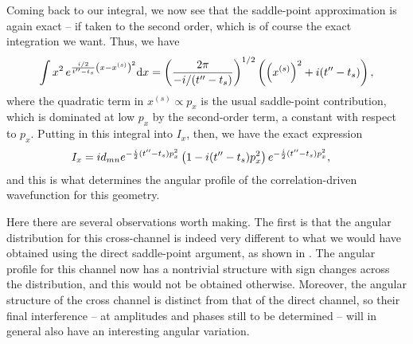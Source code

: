 Coming back to our integral, we now see that the saddle-point approximation is again exact -- if taken to the second order, which is of course the exact integration we want. Thus, we have
\begin{equation}
\int 
x^2 \,
e^{\frac{i/2}{t''-{t_s}}\left(x-x^{(s)}\right)^2}
\mathrm{d} x
=
\left(
 \frac{2\pi}{-i/(t''-{t_s})}
 \right)^{1/2}
\left(
\left(x^{(s)}\right)^2 + i (t''-{t_s})
\right)
,
\end{equation}
where the quadratic term in $x^{(s)}\propto p_x$ is the usual saddle-point contribution, which is dominated at low $p_x$ by the second-order term, a constant with respect to $p_x$. Putting in this integral into $I_x$, then, we have the exact expression
\begin{align}
I_x
& =
i d_{mn}
e^{-\frac{i}{2} (t''-{t_s})p_x^2}
\left(  1 - i(t''-{t_s})p_x^2  \right)
e^{-\frac{i}{2} (t''-{t_s})p_x^2}
,
\label{e3-Ix-final}
\end{align}
and this is what determines the angular profile of the correlation-driven wavefunction for this geometry.


Here there are several observations worth making. The first is that the angular distribution for this cross-channel is indeed very different to what we would have obtained using the direct saddle-point argument, as shown in . The angular profile for this channel now has a nontrivial structure with sign changes across the distribution, and this would not be obtained otherwise. Moreover, the angular structure of the cross channel is distinct from that of the direct channel, so their final interference -- at amplitudes and phases still to be determined -- will in general also have an interesting angular variation.


